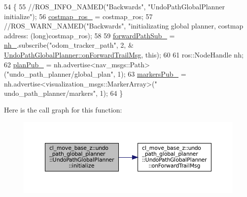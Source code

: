 \begin{DoxyCode}
54         \{
55             \textcolor{comment}{//ROS\_INFO\_NAMED("Backwards", "UndoPathGlobalPlanner initialize");}
56             \hyperlink{classcl__move__base__z_1_1undo__path__global__planner_1_1UndoPathGlobalPlanner_ab63eeb465e3ae989a6edcc4d059cf8f0}{costmap\_ros\_} = costmap\_ros;
57             \textcolor{comment}{//ROS\_WARN\_NAMED("Backwards", "initializating global planner, costmap address: %
       (long)costmap\_ros);}
58 
59             \hyperlink{classcl__move__base__z_1_1undo__path__global__planner_1_1UndoPathGlobalPlanner_a1cdf8a98469b5841d05a8cec9ad6f675}{forwardPathSub\_} = \hyperlink{classcl__move__base__z_1_1undo__path__global__planner_1_1UndoPathGlobalPlanner_a5db1360cd47ccdf63276c75f507d6470}{nh\_}.subscribe(\textcolor{stringliteral}{"odom\_tracker\_path"}, 2, &
      \hyperlink{classcl__move__base__z_1_1undo__path__global__planner_1_1UndoPathGlobalPlanner_ae5e3c5922ceb8783a6a01d904fc9c230}{UndoPathGlobalPlanner::onForwardTrailMsg}, \textcolor{keyword}{this});
60 
61             ros::NodeHandle nh;
62             \hyperlink{classcl__move__base__z_1_1undo__path__global__planner_1_1UndoPathGlobalPlanner_a65bf364a122d5950baf1bf8b42309d68}{planPub\_} = nh.advertise<nav\_msgs::Path>(\textcolor{stringliteral}{"undo\_path\_planner/global\_plan"}, 1);
63             \hyperlink{classcl__move__base__z_1_1undo__path__global__planner_1_1UndoPathGlobalPlanner_abfa0536872a0e3f8c823bebf0ed398fb}{markersPub\_} = nh.advertise<visualization\_msgs::MarkerArray>(\textcolor{stringliteral}{"
      undo\_path\_planner/markers"}, 1);
64         \}
\end{DoxyCode}
Here is the call graph for this function\+:
\nopagebreak
\begin{figure}[H]
\begin{center}
\leavevmode
\includegraphics[width=350pt]{classcl__move__base__z_1_1undo__path__global__planner_1_1UndoPathGlobalPlanner_a69e0fbb98872f108f679b2a6620638f5_cgraph}
\end{center}
\end{figure}
\mbox{\label{classcl__move__base__z_1_1undo__path__global__planner_1_1UndoPathGlobalPlanner_a46034d27c0811abae440009457a7f8b0}} 
